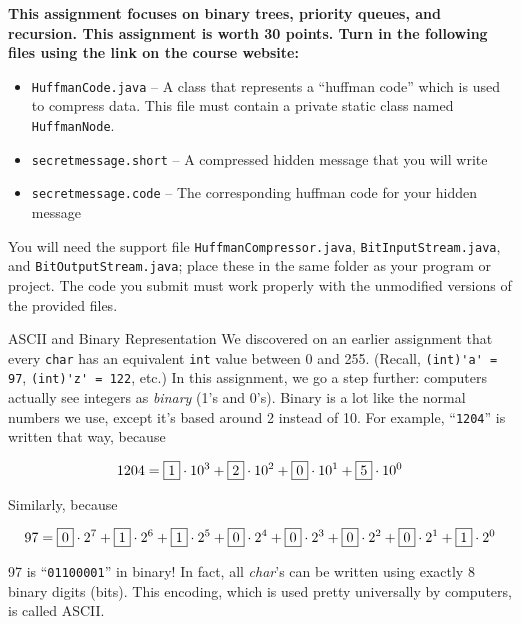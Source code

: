 \documentclass[programming]{../../mfcs}
\begin{document}
\vspace{-2.5em}
{\bf\color{colour} This assignment focuses on binary trees, priority queues, and recursion. This assignment is worth 30 points.
Turn in the following files using the link on the course website:}

\begin{itemize}\setlength{\itemindent}{-1.5em}
  \item \texttt{HuffmanCode.java} -- A class that represents a ``huffman code'' which
      is used to compress data. This file must contain a private static class named \texttt{HuffmanNode}.
  \item \texttt{secretmessage.short} -- A compressed hidden message that you will write
  \item \texttt{secretmessage.code} -- The corresponding huffman code for your hidden message
\end{itemize}

You will need the support file \texttt{HuffmanCompressor.java},
\texttt{BitInputStream.java}, and \texttt{BitOutputStream.java}; place these in the same
folder as your program or project.
The code you submit must work properly with the unmodified versions of the provided files.


\vspace{1em}

\begin{question}{ASCII and Binary Representation}
    We discovered on an earlier assignment that every \texttt{char} has an equivalent
    \texttt{int} value between 0 and 255.  (Recall,
    \verb+(int)'a' = 97+, \verb+(int)'z' = 122+, etc.)  In this assignment, we go a step
    further: computers actually see integers as \emph{binary} (1's and 0's).  Binary is a
    lot like the normal numbers we use, except it's based around 2 instead of 10.  For
    example, ``\texttt{1204}'' is written that way, because

    \vspace{-1em}

    $$1204 = \fbox{1} \cdot 10^3 + \fbox{2} \cdot 10^2 + \fbox{0} \cdot 10^1 + \fbox{5} \cdot 10^0$$

    \vspace*{-1em}

    Similarly, because

    \vspace*{-1em}

    $$97 = \fbox{0} \cdot 2^7 + \fbox{1} \cdot 2^6 + \fbox{1} \cdot 2^5 + \fbox{0} \cdot 2^4 + \fbox{0} \cdot 2^3 + \fbox{0} \cdot 2^2 +
    \fbox{0} \cdot 2^1 + \fbox{1} \cdot 2^0$$

    \vspace*{-0.2em}

    97 is ``\texttt{01100001}'' in binary!  In fact, all \emph{char}'s can be written using
    exactly 8 binary digits (bits).  This encoding, which is used pretty universally by
    computers, is called ASCII.
\end{question}
\end{document}
